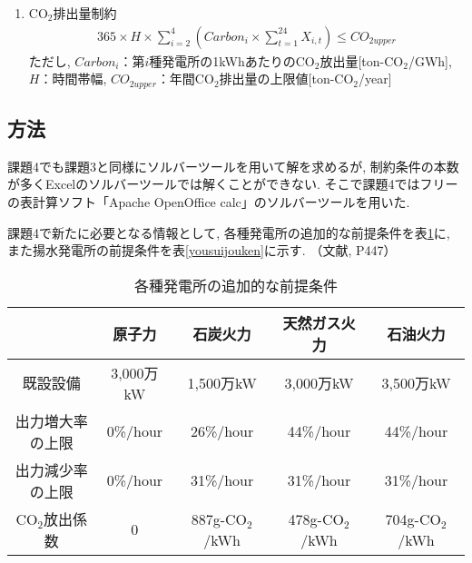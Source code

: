 \documentclass[]{jsarticle}
\begin{document}
\begin{enumerate}
            \item CO$_2$排出量制約
              \begin{eqnarray}
                \label{jouken_last}
                365 \times H \times \sum_{i=2}^4 (Carbon_i \times \sum_{t = 1}^{24} X_{i, t}) \le CO_{2upper}
              \end{eqnarray}
              ただし, $Carbon_i$：第$i$種発電所の1kWhあたりのCO$_2$放出量[ton-CO$_2$/GWh], $H$：時間帯幅, $CO_{2upper}$：年間CO$_2$排出量の上限値[ton-CO$_2$/year]

          \end{enumerate}


  \subsection{方法}
    課題4でも課題3と同様にソルバーツールを用いて解を求めるが, 制約条件の本数が多くExcelのソルバーツールでは解くことができない. そこで課題4ではフリーの表計算ソフト「Apache OpenOffice calc」のソルバーツールを用いた.

    課題4で新たに必要となる情報として, 各種発電所の追加的な前提条件を表\ref{additional}に, また揚水発電所の前提条件を表\ref{yousuijouken}に示す. （文献\cite{t}, P447）

    \begin{table}[htb]
      \begin{center}
        \caption{各種発電所の追加的な前提条件\cite{t}}
        \begin{tabular}{|c|c|c|c|c|} \hline
              　     & 原子力 & 石炭火力 & 天然ガス火力 & 石油火力 \\ \hline
          既設設備 & 3,000万kW & 1,500万kW & 3,000万kW & 3,500万kW \\ \hline
          出力増大率の上限 & 0\%/hour & 26\%/hour & 44\%/hour & 44\%/hour \\ \hline
          出力減少率の上限 & 0\%/hour & 31\%/hour & 31\%/hour & 31\%/hour \\ \hline
          CO$_2$放出係数 & 0 & 887g-CO$_2$/kWh & 478g-CO$_2$/kWh & 704g-CO$_2$/kWh \\ \hline
        \end{tabular}
        \label{additional}
      \end{center}
    \end{table}
\end{document}

